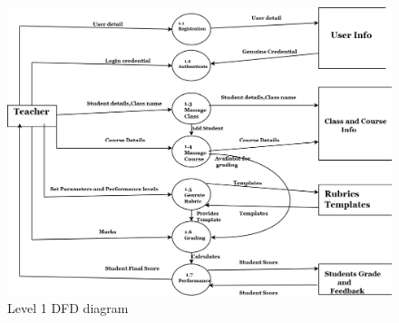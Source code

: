 \begin{figure}[!h]

\hfill\includegraphics[scale=.37]{project/images/level1}\hspace*{\fill}
\caption{Level 1 DFD diagram}
\end{figure}
